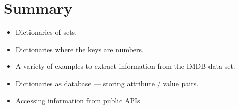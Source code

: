 \documentclass[letterpaper,10pt,english]{sphinxmanual}
\begin{document}
\section{Summary}
\label{\detokenize{lecture_notes/lec17_dictionaries2:summary}}\begin{itemize}
\item {} 
Dictionaries of sets.

\item {} 
Dictionaries where the keys are numbers.

\item {} 
A variety of examples to extract information from the IMDB data set.

\item {} 
Dictionaries as database — storing attribute / value pairs.

\item {} 
Accessing information from public APIs

\end{itemize}
\end{document}

